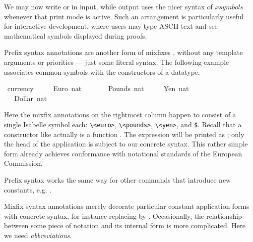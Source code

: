 \begin{isabellebody}
\begin{isamarkuptext}
We may now write  or  in input, while
output uses the nicer syntax of $xsymbols$ whenever that print mode is
active.  Such an arrangement is particularly useful for interactive
development, where users may type ASCII text and see mathematical
symbols displayed during proofs.%
\end{isamarkuptext}%
\isamarkuptrue%
%
\isamarkuptrue%
%
\begin{isamarkuptext}%
Prefix syntax annotations are another form
  of mixfixes \cite{isabelle-ref}, without any template arguments or
  priorities --- just some literal syntax.  The following example
  associates common symbols with the constructors of a datatype.%
\end{isamarkuptext}%
\isamarkuptrue%
\isamarkupfalse%
\ currency\ {\isacharequal}\isanewline
\ \ \ \ Euro\ nat\ \ \ \ {\isacharparenleft}{\isachardoublequoteopen}{\isasymeuro}{\isachardoublequoteclose}{\isacharparenright}\isanewline
\ \ {\isacharbar}\ Pounds\ nat\ \ {\isacharparenleft}{\isachardoublequoteopen}{\isasympounds}{\isachardoublequoteclose}{\isacharparenright}\isanewline
\ \ {\isacharbar}\ Yen\ nat\ \ \ \ \ {\isacharparenleft}{\isachardoublequoteopen}{\isasymyen}{\isachardoublequoteclose}{\isacharparenright}\isanewline
\ \ {\isacharbar}\ Dollar\ nat\ \ {\isacharparenleft}{\isachardoublequoteopen}{\isachardollar}{\isachardoublequoteclose}{\isacharparenright}%
\begin{isamarkuptext}%
\noindent Here the mixfix annotations on the rightmost column happen
  to consist of a single Isabelle symbol each: \verb,\,\verb,<euro>,,
  \verb,\,\verb,<pounds>,, \verb,\,\verb,<yen>,, and \verb,$,.  Recall
  that a constructor like  actually is a function .  The expression  will be
  printed as ; only the head of the application is
  subject to our concrete syntax.  This rather simple form already
  achieves conformance with notational standards of the European
  Commission.

  Prefix syntax works the same way for other commands that introduce new constants, e.g. .%
\end{isamarkuptext}%
\isamarkuptrue%
%
\isamarkuptrue%
%
\begin{isamarkuptext}%
Mixfix syntax annotations merely decorate particular constant
application forms with concrete syntax, for instance replacing
 by .  Occasionally, the relationship
between some piece of notation and its internal form is more
complicated.  Here we need \emph{abbreviations}.


\end{isamarkuptext}
\end{isabellebody}
